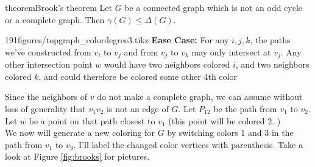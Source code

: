 \begin{doubledpage}{theorem}{Brook's theorem \cite{brooks1941colouring}}{ 
  Let $G$ be a connected graph which is not an odd cycle or a complete graph. Then $\gamma(G)\leq \Delta(G)$. \label{emb:thm:brooks}}
\begin{paragraphfigureenv}{191figures/topgraph_colordegree3.tikz}
  \textbf{Ease Case:} For any $i, j, k$, the paths we've constructed from $v_i$ to $v_j$ and from $v_j$ to $v_k$ may only intersect at $v_j$. Any other intersection point $w$ would have two neighbors colored $i$, and two neighbors colored $k$, and could therefore be colored some other 4th color
\end{paragraphfigureenv}


Since the neighbors of $v$ do not make a complete graph, we can assume without loss of generality that $v_1v_2$ is not an edge of $G$.  Let $P_{12}$ be the path from $v_1$ to $v_2$. 
Let $w$ be a point on that path closest to $v_1$ (this point will be colored $2$. ) \\
We now will generate a new coloring for $G$ by switching colors 1 and 3 in the path from $v_1$ to $v_3$. I'll label the changed color vertices with parenthesis. Take a look at Figure \ref{fig:brooks} for pictures.

\begin{figure}[h]
  
\centering
{}
\end{figure}
\end{doubledpage}
